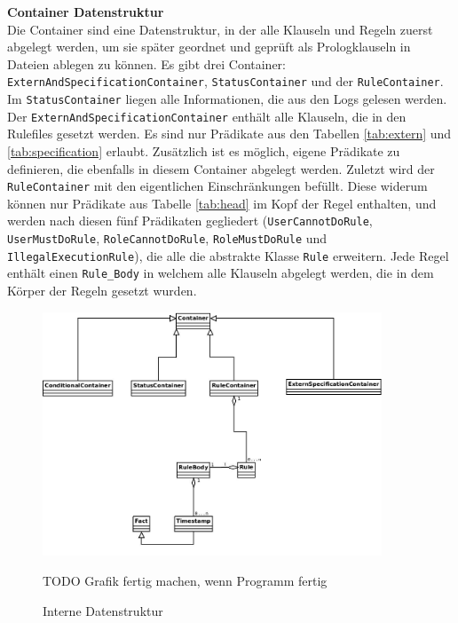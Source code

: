 \textbf{Container Datenstruktur}\\
Die Container sind eine Datenstruktur, in der alle Klauseln und Regeln zuerst abgelegt werden, um sie später geordnet und geprüft als Prologklauseln in Dateien ablegen zu können. Es gibt drei Container: \texttt{ExternAndSpecificationContainer}, \texttt{StatusContainer} und der \texttt{RuleContainer}. Im \texttt{StatusContainer} liegen alle Informationen, die aus den Logs gelesen werden. \newline
Der \texttt{ExternAndSpecificationContainer} enthält alle Klauseln, die in den Rulefiles gesetzt werden. Es sind nur Prädikate aus den Tabellen \ref{tab:extern} und \ref{tab:specification} erlaubt. Zusätzlich ist es möglich, eigene Prädikate zu definieren, die ebenfalls in diesem Container abgelegt werden. Zuletzt wird der \texttt{RuleContainer} mit den eigentlichen Einschränkungen befüllt. Diese widerum können nur Prädikate aus Tabelle \ref{tab:head} im Kopf der Regel enthalten, und werden nach diesen fünf Prädikaten gegliedert (\texttt{UserCannotDoRule}, \texttt{UserMustDoRule}, \texttt{RoleCannotDoRule}, \texttt{RoleMustDoRule} und \newline
\texttt{IllegalExecutionRule}), die alle die abstrakte Klasse \texttt{Rule} erweitern. Jede Regel enthält einen \texttt{Rule\_Body} in welchem alle Klauseln abgelegt werden, die in dem Körper der Regeln gesetzt wurden. 


\begin{figure}[ht]
	\centering
  \includegraphics[width=0.9\textwidth]{Figures/Container}
	\caption{Interne Datenstruktur}
\color{red} TODO Grafik fertig machen, wenn Programm fertig
	\label{fig:container}
\end{figure}

